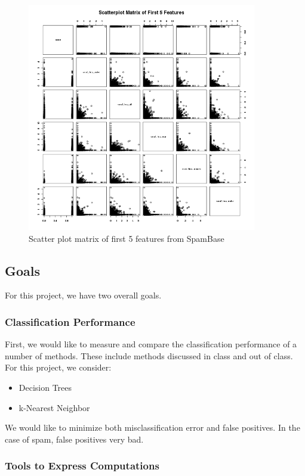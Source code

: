 \documentclass[a4paper,10pt]{article}
\begin{document}
\begin{figure}[h]
 \centering
 \includegraphics[width=100mm]{../resources/scatter-plot-5.png}
 \caption{Scatter plot matrix of first 5 features from SpamBase}
\end{figure}

\subsection{Goals}

For this project, we have two overall goals.

\subsubsection{Classification Performance}

First, we would like to measure and compare the classification performance of a number of methods. These include
methods discussed in class and out of class. For this project, we consider:

\begin{itemize}
 \item Decision Trees
 \item k-Nearest Neighbor
\end{itemize}

We would like to minimize both misclassification error and false positives. In the case of spam, false positives
very bad.

\subsubsection{Tools to Express Computations}
\end{document}
